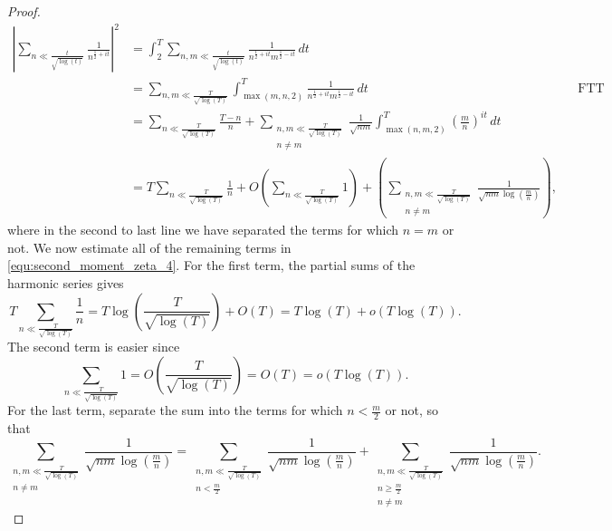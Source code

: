 \begin{proof}
\begin{equation}
        \begin{aligned}
          \left|\sum_{n \ll \frac{t}{\sqrt{\log(t)}}}\frac{1}{n^{\frac{1}{2}+it}}\right|^{2} &= \int_{2}^{T}\sum_{n,m \ll \frac{t}{\sqrt{\log(t)}}}\frac{1}{n^{\frac{1}{2}+it}m^{\frac{1}{2}-it}}\,dt \\
          &= \sum_{n,m \ll \frac{T}{\sqrt{\log(T)}}}\int_{\max(m,n,2)}^{T}\frac{1}{n^{\frac{1}{2}+it}m^{\frac{1}{2}-it}}\,dt && \text{FTT} \\
          &= \sum_{n \ll \frac{T}{\sqrt{\log(T)}}}\frac{T-n}{n}+ \sum_{\substack{n,m \ll \frac{T}{\sqrt{\log(T)}} \\ n \neq m}}\frac{1}{\sqrt{nm}}\int_{\max(n,m,2)}^{T}\left(\frac{m}{n}\right)^{it}\,dt \\
          &= T\sum_{n \ll \frac{T}{\sqrt{\log(T)}}}\frac{1}{n}+O\left(\sum_{n \ll \frac{T}{\sqrt{\log(T)}}}1\right)+\left(\sum_{\substack{n,m \ll \frac{T}{\sqrt{\log(T)}} \\ n \neq m}}\frac{1}{\sqrt{nm}\log\left(\frac{m}{n}\right)}\right),
        \end{aligned}
      \end{equation}
      where in the second to last line we have separated the terms for which $n = m$ or not. We now estimate all of the remaining terms in \cref{equ:second_moment_zeta_4}. For the first term, the partial sums of the harmonic series gives
      \begin{equation}\label{equ:second_moment_zeta_5}
        T\sum_{n \ll \frac{T}{\sqrt{\log(T)}}}\frac{1}{n} = T\log\left(\frac{T}{\sqrt{\log(T)}}\right)+O(T) = T\log(T)+o(T\log(T)).
      \end{equation}
      The second term is easier since
      \begin{equation}\label{equ:second_moment_zeta_6}
        \sum_{n \ll \frac{T}{\sqrt{\log(T)}}}1 = O\left(\frac{T}{\sqrt{\log(T)}}\right) = O(T) = o(T\log(T)).
      \end{equation}
      For the last term, separate the sum into the terms for which $n < \frac{m}{2}$ or not, so that
      \begin{equation}\label{equ:second_moment_zeta_7}
        \sum_{\substack{n,m \ll \frac{T}{\sqrt{\log(T)}} \\ n \neq m}}\frac{1}{\sqrt{nm}\log\left(\frac{m}{n}\right)} = \sum_{\substack{n,m \ll \frac{T}{\sqrt{\log(T)}} \\ n < \frac{m}{2}}}\frac{1}{\sqrt{nm}\log\left(\frac{m}{n}\right)}+\sum_{\substack{n,m \ll \frac{T}{\sqrt{\log(T)}} \\ n \ge \frac{m}{2} \\ n \neq m}}\frac{1}{\sqrt{nm}\log\left(\frac{m}{n}\right)}.

\end{equation}
\end{proof}

